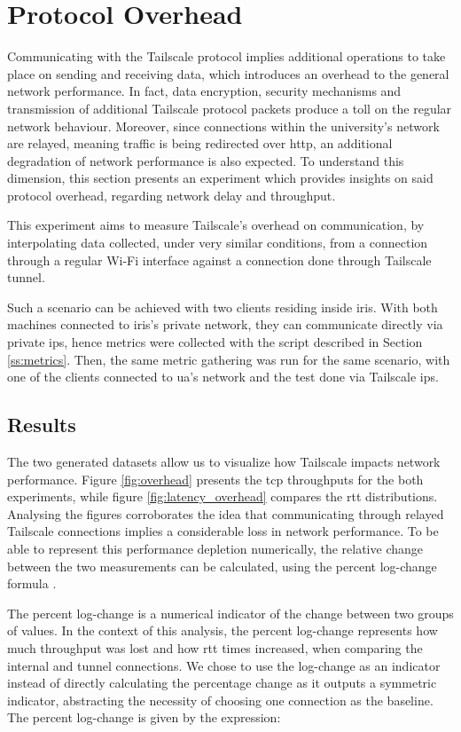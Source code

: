 \documentclass[11pt,twoside,a4paper]{report}
\begin{document}
\section{Protocol Overhead}

Communicating with the Tailscale protocol implies additional operations  to take place on sending and receiving data, which introduces an overhead to the general network performance. In fact, data encryption, security mechanisms and transmission of additional Tailscale protocol packets produce a toll on the regular network behaviour. Moreover, since connections within the university's network are relayed, meaning traffic is being redirected over \ac{http}, an additional degradation of network performance is also expected. To understand this dimension, this section presents an experiment which provides insights on said protocol overhead, regarding network delay and throughput.

This experiment aims to measure Tailscale's overhead on communication, by interpolating data collected, under very similar conditions, from a connection through a regular Wi-Fi interface against a connection done through Tailscale tunnel.

Such a scenario can be achieved with two clients residing inside \ac{iris}. With both machines connected to \ac{iris}'s private network, they can communicate directly via private \acp{ip}, hence metrics were collected with the script described in Section \ref{ss:metrics}. Then, the same metric gathering was run for the same scenario, with one of the clients connected to \ac{ua}'s network and the test done via Tailscale \acp{ip}.

\subsection{Results}

The two generated datasets allow us to visualize how Tailscale impacts network performance. Figure \ref{fig:overhead} presents the \ac{tcp} throughputs for the both experiments, while figure \ref{fig:latency_overhead} compares the \ac{rtt} distributions. Analysing the figures corroborates the idea that communicating through relayed Tailscale connections implies a considerable loss in network performance. To be able to represent this performance depletion numerically, the relative change between the two measurements can be calculated, using the percent log-change formula \cite{tornqvist1985should}.

The percent log-change is a numerical indicator of the change between two groups of values. In the context of this analysis, the percent log-change represents how much throughput was lost and how \ac{rtt} times increased, when comparing the internal and tunnel connections. We chose to use the log-change as an indicator instead of directly calculating the percentage change as it outputs a symmetric indicator, abstracting the necessity of choosing one connection as the baseline. The percent log-change is given by the expression:
\end{document}
